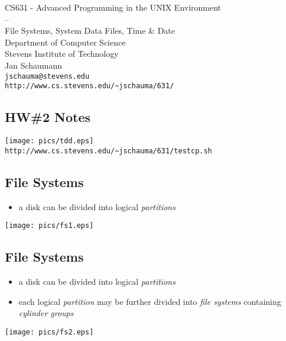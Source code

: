 \documentclass[xga]{xdvislides}
\begin{document}
\setfontphv

\lhead{\slidetitle}
\cfoot{\relax}
\rfoot{\Gray{\today}}

\vspace*{\fill}
\begin{center}
	\Hugesize
		CS631 - Advanced Programming in the UNIX Environment\\
		-- \\
		File Systems, System Data Files, Time \& Date
	\hspace*{5mm}\blueline\\ [1em]
	\Normalsize
		Department of Computer Science\\
		Stevens Institute of Technology\\
		Jan Schaumann\\
		\verb+jschauma@stevens.edu+\\
		\verb+http://www.cs.stevens.edu/~jschauma/631/+
\end{center}
\vspace*{\fill}

\subsection{HW\#2 Notes}
\vspace*{\fill}
\begin{center}
\texttt{[image: pics/tdd.eps]} \\
{\tt http://www.cs.stevens.edu/\~{}jschauma/631/testcp.sh}
\end{center}
\vspace*{\fill}

\subsection{File Systems}
\begin{itemize}
	\item a disk can be divided into logical {\em partitions}
\end{itemize}
\texttt{[image: pics/fs1.eps]}


\subsection{File Systems}
\begin{itemize}
	\item a disk can be divided into logical {\em partitions}
	\item each logical {\em partition} may be further divided into
		{\em file systems} containing {\em cylinder groups}
\end{itemize}
\texttt{[image: pics/fs2.eps]}
\end{document}
